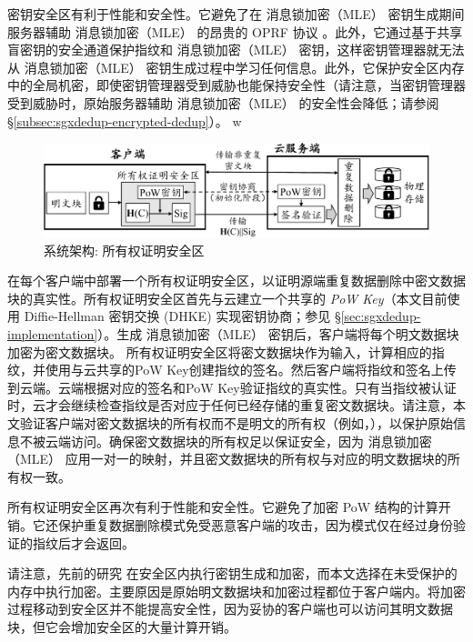 密钥安全区有利于性能和安全性。它避免了在 消息锁加密（MLE） 密钥生成期间服务器辅助 消息锁加密（MLE） 的昂贵的 OPRF 协议 \cite{bellare2013DupLESS}。此外，它通过基于共享盲密钥的安全通道保护指纹和 消息锁加密（MLE） 密钥，这样密钥管理器就无法从 消息锁加密（MLE） 密钥生成过程中学习任何信息。此外，它保护安全区内存中的全局机密，即使密钥管理器受到威胁也能保持安全性（请注意，当密钥管理器受到威胁时，原始服务器辅助 消息锁加密（MLE） 的安全性会降低；请参阅 \S\ref{subsec:sgxdedup-encrypted-dedup}）。
  w
\begin{figure}[!htb]
  \centering
  \includegraphics[width=\textwidth]{pic/sgxdedup/pow.pdf}
  \caption{\sysnameS 系统架构: 所有权证明安全区}
  \label{fig:sgxdedup-overview-pow}
  \vspace{-3pt}
\end{figure}

\sysnameS 在每个客户端中部署一个所有权证明安全区，以证明源端重复数据删除中密文数据块的真实性。所有权证明安全区首先与云建立一个共享的 \textit{PoW Key}（本文目前使用 Diffie-Hellman 密钥交换 (DHKE) 实现密钥协商；参见 \S\ref{sec:sgxdedup-implementation}）。生成 消息锁加密（MLE） 密钥后，客户端将每个明文数据块加密为密文数据块。 所有权证明安全区将密文数据块作为输入，计算相应的指纹，并使用与云共享的PoW Key创建指纹的签名。然后客户端将指纹和签名上传到云端。云端根据对应的签名和PoW Key验证指纹的真实性。只有当指纹被认证时，云才会继续检查指纹是否对应于任何已经存储的重复密文数据块。请注意，本文验证客户端对密文数据块的所有权而不是明文的所有权（例如，\cite{halevi11}），以保护原始信息不被云端访问。确保密文数据块的所有权足以保证安全，因为 消息锁加密（MLE） 应用一对一的映射，并且密文数据块的所有权与对应的明文数据块的所有权一致。

所有权证明安全区再次有利于性能和安全性。它避免了加密 PoW 结构的计算开销。它还保护重复数据删除模式免受恶意客户端的攻击，因为模式仅在经过身份验证的指纹后才会返回。

请注意，先前的研究 \cite{kim19,fuhry20,djoko2019NEXUS} 在安全区内执行密钥生成和加密，而本文选择在未受保护的内存中执行加密。主要原因是原始明文数据块和加密过程都位于客户端内。将加密过程移动到安全区并不能提高安全性，因为妥协的客户端也可以访问其明文数据块，但它会增加安全区的大量计算开销。

